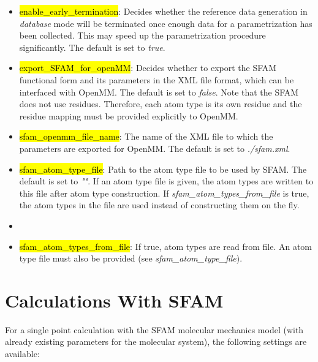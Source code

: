 \documentclass[]{tufte-book}
\begin{document}
{{\begin{itemize}
\item \hl{enable\_early\_termination}: Decides whether the reference data generation in \textit{database} mode will be terminated once enough data for a parametrization has been collected. This may speed up the parametrization procedure significantly. The default is set to \textit{true}.
\item \hl{export\_SFAM\_for\_openMM}: Decides whether to export the SFAM functional form and its parameters in the XML file format, which can be interfaced with OpenMM.\cite{eastman2017} The default is set to \textit{false}.
Note that the SFAM does not use residues. Therefore, each atom type is its own residue and the residue mapping must be provided explicitly to OpenMM.
\item \hl{sfam\_openmm\_file\_name}: The name of the XML file to which the parameters are exported for OpenMM.\cite{eastman2017} The default is set to \textit{./sfam.xml}.
\item \hl{sfam\_atom\_type\_file}: Path to the atom type file to be used by SFAM. The default is set to \textit{""}. If an atom type file is given, the atom types are written to this file after atom type construction. If \textit{sfam\_atom\_types\_from\_file} is true, the atom types in the file are used instead of constructing them on the fly.
\item \item \hl{sfam\_atom\_types\_from\_file}: If true, atom types are read from file. An atom type file must also be provided (see \textit{sfam\_atom\_type\_file}).
\end{itemize}

\chapter{Calculations With SFAM}\label{ch:mm_calculation}
\label{sec:sfam_calc}

For a single point calculation with the SFAM molecular mechanics model (with already existing parameters for the molecular system), the following settings are available:

}}
\end{document}

